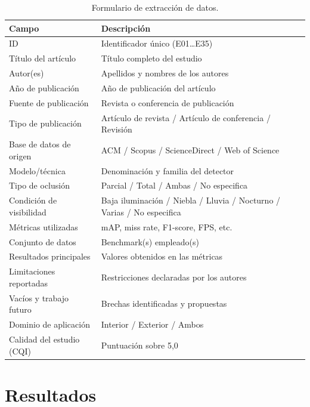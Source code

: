 \documentclass[12pt, a4paper]{article}
\begin{document}
\begin{table}[H]
\centering
\caption{Formulario de extracci\'{o}n de datos.}
\label{tab:extraccion}
\begin{tabularx}{\linewidth}{lX}
\toprule
\textbf{Campo} & \textbf{Descripci\'{o}n} \\
\midrule
ID                       & Identificador \'{u}nico (E01\ldots E35) \\
T\'{i}tulo del art\'{i}culo & T\'{i}tulo completo del estudio \\
Autor(es)                & Apellidos y nombres de los autores \\
A\~{n}o de publicaci\'{o}n & A\~{n}o de publicaci\'{o}n del
                             art\'{i}culo \\
Fuente de publicaci\'{o}n & Revista o conferencia de publicaci\'{o}n \\
Tipo de publicaci\'{o}n  & Art\'{i}culo de revista / Art\'{i}culo de
                           conferencia / Revisi\'{o}n \\
Base de datos de origen  & ACM / Scopus / ScienceDirect /
                           Web of Science \\
Modelo/t\'{e}cnica       & Denominaci\'{o}n y familia del detector \\
Tipo de oclusi\'{o}n     & Parcial / Total / Ambas / No especifica \\
Condici\'{o}n de visibilidad & Baja iluminaci\'{o}n / Niebla / Lluvia
                               / Nocturno / Varias / No especifica \\
M\'{e}tricas utilizadas  & mAP, miss rate, F1-score, FPS, etc. \\
Conjunto de datos        & Benchmark(s) empleado(s) \\
Resultados principales   & Valores obtenidos en las m\'{e}tricas \\
Limitaciones reportadas  & Restricciones declaradas por los autores \\
Vac\'{i}os y trabajo futuro & Brechas identificadas y propuestas \\
Dominio de aplicaci\'{o}n & Interior / Exterior / Ambos \\
Calidad del estudio (CQI) & Puntuaci\'{o}n sobre 5{,}0 \\
\bottomrule
\end{tabularx}
\end{table}

\section{Resultados}
\label{sec:resultados}
\end{document}
